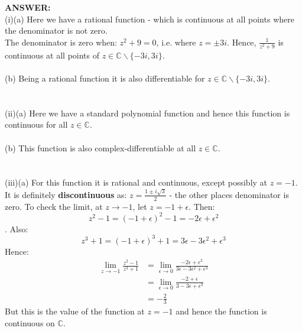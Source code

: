 \documentclass[12pt,a4paper]{article}
\begin{document}
\vspace{1cm}

\textbf{ANSWER:}\\
(i)(a) Here we have a rational function - which is continuous at all points where the denominator is not zero.\\
The denominator is zero when: $z^2+9=0$, i.e. where $z = \pm 3i$.  Hence, $\frac{1}{z^2 + 9}$ is continuous 
at all points of $z \in \mathbb{C} \backslash \{-3i, 3i \}$.\\
\\
(b) Being a rational function it is also differentiable for $z \in \mathbb{C} \backslash \{-3i, 3i \}$.\\
\\
\\
(ii)(a) Here we have a standard polynomial function and hence this function is continuous for all $z \in \mathbb{C}$.\\
\\
(b) This function is also complex-differentiable at all $z \in \mathbb{C}$.\\
\\
\\
(iii)(a) For this function it is rational and continuous, except possibly at $z=-1$.  It is definitely \textbf{discontinuous} as:
$z=\frac{1 \pm i \sqrt{3}}{2}$ - the other places denominator is zero.
To check the limit, at $z \to -1$, let $z=-1+\epsilon$.  Then:
$$ z^2-1 = (-1 + \epsilon)^2 -1 = -2\epsilon + \epsilon^2$$.
Also:
$$z^3 + 1 = (-1 + \epsilon)^3 +1 = 3\epsilon - 3\epsilon^2 + \epsilon^3$$
Hence:
\begin{align*}
    \lim_{z \to -1}\frac{z^2-1}{z^3+1} &= \lim_{\epsilon \to 0}\frac{-2\epsilon + \epsilon^2}{3\epsilon - 3\epsilon^2 + \epsilon^3} \\
&= \lim_{\epsilon \to 0}\frac{-2 + \epsilon}{3 - 3\epsilon + \epsilon^2} \\
&= -\frac{2}{3}
\end{align*}
But this is the value of the function at $z=-1$ and hence the function is continuous on $\mathbb{C}$.
\end{document}
